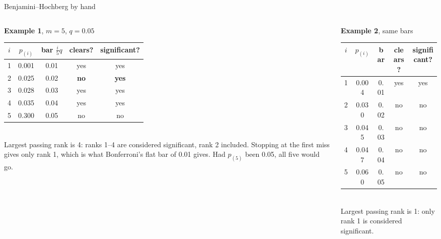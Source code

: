 \documentclass[aspectratio=169]{beamer}
\begin{document}
\begin{frame}{Benjamini--Hochberg by hand}
  \begin{columns}[T]
    \begin{column}{0.5\textwidth}
      \textbf{Example 1}, $m=5$, $q=0.05$\\[0.3em]
      \setlength{\tabcolsep}{4pt}\begin{tabular}{ccccc}
        \toprule
        $i$ & $p_{(i)}$ & bar $\tfrac{i}{5}q$ & clears? & significant? \\
        \midrule
        1 & 0.001 & 0.01 & yes & yes \\
        2 & 0.025 & 0.02 & \textbf{no} & \textbf{yes} \\
        3 & 0.028 & 0.03 & yes & yes \\
        4 & 0.035 & 0.04 & yes & yes \\
        5 & 0.300 & 0.05 & no & no \\
        \bottomrule
      \end{tabular}\\[0.4em]
      \small Largest passing rank is 4: ranks 1--4 are considered significant, rank 2 included. Stopping at the first miss gives only rank 1, which is what Bonferroni's flat bar of 0.01 gives. Had $p_{(5)}$ been 0.05, all five would go.
    \end{column}
    \begin{column}{0.46\textwidth}
      \textbf{Example 2}, same bars\\[0.3em]
      \setlength{\tabcolsep}{4pt}\begin{tabular}{ccccc}
        \toprule
        $i$ & $p_{(i)}$ & bar & clears? & significant? \\
        \midrule
        1 & 0.004 & 0.01 & yes & yes \\
        2 & 0.030 & 0.02 & no & no \\
        3 & 0.045 & 0.03 & no & no \\
        4 & 0.047 & 0.04 & no & no \\
        5 & 0.060 & 0.05 & no & no \\
        \bottomrule
      \end{tabular}\\[0.4em]
      \small Largest passing rank is 1: only rank 1 is considered significant.
    \end{column}
  \end{columns}
\end{frame}
\end{document}
